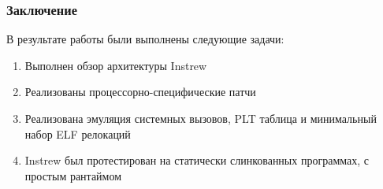\documentclass{beamer}
\begin{document}
\begin{frame}
  \frametitle{Заключение}
  В результате работы были выполнены следующие задачи:
  \vspace{8pt}
  \begin{enumerate}
    \item Выполнен обзор архитектуры Instrew
    \item Реализованы процессорно-специфические патчи
    \item Реализована эмуляция системных вызовов, PLT таблица и минимальный набор ELF релокаций
    \item Instrew был протестирован на статически слинкованных программах, с простым рантаймом
  \end{enumerate}
  \vspace{8pt}

\end{frame}

\appendix



\end{document}
